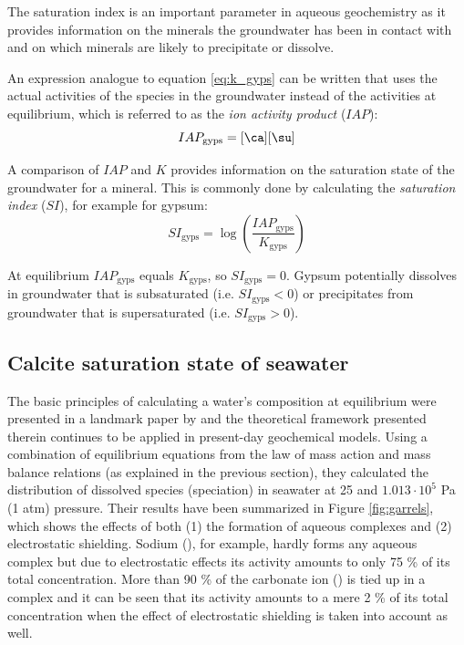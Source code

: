 The saturation index is an important parameter in aqueous geochemistry as it provides information on the minerals the groundwater has been in contact with and on which minerals are likely to precipitate or dissolve.

An expression analogue to equation \ref{eq:k_gyps} can be written that uses the actual activities of the species in the groundwater instead of the activities at equilibrium, which is referred to as the \textit{ion activity product} ($IAP$):
\begin{equation}
IAP_\text{gyps} = [\ca][\su]
\end{equation}

A comparison of $IAP$ and $K$ provides information on the saturation state of the groundwater for a mineral. This is commonly done by calculating the \textit{saturation index} ($SI$), for example for gypsum:
\begin{equation}
SI_\text{gyps} = \log \left(\frac{IAP_\text{gyps}}{K_\text{gyps}} \right)
\label{eq:si_gyps}
\end{equation}

At equilibrium $IAP_\text{gyps}$ equals $K_\text{gyps}$, so $SI_\text{gyps} = 0$. Gypsum potentially dissolves in groundwater that is subsaturated (i.e. $SI_\text{gyps} < 0$) or precipitates from groundwater that is supersaturated (i.e. $SI_\text{gyps} > 0$).

\subsection{Calcite saturation state of seawater}
The basic principles of calculating a water's composition at equilibrium were presented in a landmark paper by \citet{garrels_thompson1963} and the theoretical framework presented therein continues to be applied in present-day geochemical models. Using a combination of equilibrium equations from the law of mass action and mass balance relations (as explained in the previous section), they calculated the distribution of dissolved species (speciation) in seawater at \unit{25}{\celsius} and $1.013 \cdot 10^5$ Pa (1 atm) pressure. Their results have been summarized in Figure \ref{fig:garrels}, which shows the effects of both (1) the formation of aqueous complexes and (2) electrostatic shielding. Sodium (\na), for example, hardly forms any aqueous complex but due to electrostatic effects its activity amounts to only 75 \% of its total concentration. More than 90 \% of the carbonate ion (\cb) is tied up in a complex and it can be seen that its activity amounts to a mere 2 \% of its total concentration when the effect of electrostatic shielding is taken into account as well.

